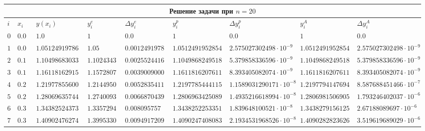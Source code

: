 \begin{table}[h!]
	\hspace{-6em}
	\scriptsize
	\begin{tabular}{|l|l|l|l|l|l|l|l|l|}
		\hline
		\multicolumn{9}{|c|}{Решение задачи при $n = 20$}                                                                                                                                                                        \\
		\hline
		$i$    & $x_i$                    & $y(x_i)$               & $y^e_i$        & $\Delta y^e_i$    & $y^p_i$              & $\Delta y^p_i$                    & $y^A_i$                  & $\Delta y^A_i$                   \\
		\hline
		$  0 $ & $                 0.00 $ & $                1.0 $ & $          1 $ & $           0.0 $ & $                1 $ & $                 0.0 $           & $                    1 $ & $                 0.0 $          \\
		$  1 $ & $                0.05 $  & $     1.051249197860 $ & $       1.05 $ & $ 0.00124919786 $ & $ 1.05124919528542 $ & $  2.575027302498 \cdot 10^{-9} $ & $ 1.05124919528542 $     & $  2.575027302498\cdot 10^{-9} $ \\
		$  2 $ & $                 0.10 $ & $     1.104986830331 $ & $ 1.10243438 $ & $  0.0025524416 $ & $ 1.10498682495183 $ & $  5.379858336596 \cdot 10^{-9} $ & $ 1.10498682495183 $     & $  5.379858336596\cdot 10^{-9} $ \\
		$  3 $ & $                0.15 $  & $     1.161181629154 $ & $ 1.15728072 $ & $  0.0039009000 $ & $ 1.16118162076118 $ & $  8.393405082074 \cdot 10^{-9} $ & $ 1.16118162076118 $     & $  8.393405082074\cdot 10^{-9} $ \\
		$  4 $ & $                 0.20 $ & $      1.21977855600 $ & $ 1.21449501 $ & $  0.0052835411 $ & $ 1.21977854441158 $ & $ 1.1589031290171 \cdot 10^{-8} $ & $  1.2197794147694 $     & $  8.587688451466\cdot 10^{-7} $ \\
		$  5 $ & $                0.25 $  & $     1.280696357444 $ & $ 1.27400931 $ & $  0.0066870439 $ & $ 1.28069634250895 $ & $ 1.4935216618994 \cdot 10^{-8} $ & $ 1.28069815069057 $     & $  1.793246402037\cdot 10^{-6} $ \\
		$  6 $ & $                 0.30 $ & $     1.343825243731 $ & $ 1.33572948 $ & $   0.008095757 $ & $ 1.34382522533517 $ & $  1.839648100521 \cdot 10^{-8} $ & $ 1.34382791561255 $     & $   2.67188089697\cdot 10^{-6} $ \\
		$  7 $ & $                0.35 $  & $      1.40902476274 $ & $ 1.39953304 $ & $  0.0094917209 $ & $  1.4090247408083 $ & $ 2.1934531968526 \cdot 10^{-8} $ & $  1.4090282823626 $     & $  3.519619689029\cdot 10^{-6} $ \\

\end{tabular}
\end{table}
